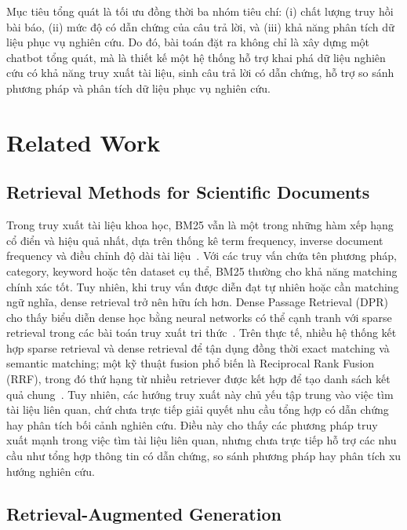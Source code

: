 \documentclass[conference]{IEEEtran}
\begin{document}
Mục tiêu tổng quát là tối ưu đồng thời ba nhóm tiêu chí: (i) chất lượng truy hồi bài báo, (ii) mức độ có dẫn chứng của câu trả lời, và (iii) khả năng phân tích dữ liệu phục vụ nghiên cứu. Do đó, bài toán đặt ra không chỉ là xây dựng một chatbot tổng quát, mà là thiết kế một hệ thống hỗ trợ khai phá dữ liệu nghiên cứu có khả năng truy xuất tài liệu, sinh câu trả lời có dẫn chứng, hỗ trợ so sánh phương pháp và phân tích dữ liệu phục vụ nghiên cứu.

\section{Related Work}

\subsection{Retrieval Methods for Scientific Documents}

Trong truy xuất tài liệu khoa học, BM25 vẫn là một trong những hàm xếp hạng cổ điển và hiệu quả nhất, dựa trên thống kê term frequency, inverse document frequency và điều chỉnh độ dài tài liệu~\cite{robertson1994simple}. Với các truy vấn chứa tên phương pháp, category, keyword hoặc tên dataset cụ thể, BM25 thường cho khả năng matching chính xác tốt. Tuy nhiên, khi truy vấn được diễn đạt tự nhiên hoặc cần matching ngữ nghĩa, dense retrieval trở nên hữu ích hơn. Dense Passage Retrieval (DPR) cho thấy biểu diễn dense học bằng neural networks có thể cạnh tranh với sparse retrieval trong các bài toán truy xuất tri thức~\cite{karpukhin2020dense}. Trên thực tế, nhiều hệ thống kết hợp sparse retrieval và dense retrieval để tận dụng đồng thời exact matching và semantic matching; một kỹ thuật fusion phổ biến là Reciprocal Rank Fusion (RRF), trong đó thứ hạng từ nhiều retriever được kết hợp để tạo danh sách kết quả chung~\cite{cormack2009reciprocal}. Tuy nhiên, các hướng truy xuất này chủ yếu tập trung vào việc tìm tài liệu liên quan, chứ chưa trực tiếp giải quyết nhu cầu tổng hợp có dẫn chứng hay phân tích bối cảnh nghiên cứu. Điều này cho thấy các phương pháp truy xuất mạnh trong việc tìm tài liệu liên quan, nhưng chưa trực tiếp hỗ trợ các nhu cầu như tổng hợp thông tin có dẫn chứng, so sánh phương pháp hay phân tích xu hướng nghiên cứu.

\subsection{Retrieval-Augmented Generation}
\end{document}
